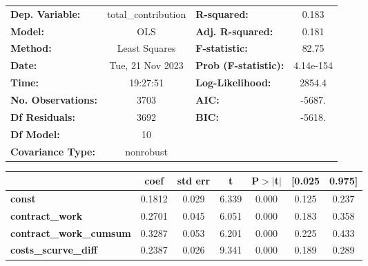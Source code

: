 \begin{center}
\begin{tabular}{lclc}
\toprule
\textbf{Dep. Variable:}                   & total\_contribution & \textbf{  R-squared:         } &     0.183   \\
\textbf{Model:}                           &         OLS         & \textbf{  Adj. R-squared:    } &     0.181   \\
\textbf{Method:}                          &    Least Squares    & \textbf{  F-statistic:       } &     82.75   \\
\textbf{Date:}                            &   Tue, 21 Nov 2023  & \textbf{  Prob (F-statistic):} & 4.14e-154   \\
\textbf{Time:}                            &       19:27:51      & \textbf{  Log-Likelihood:    } &    2854.4   \\
\textbf{No. Observations:}                &          3703       & \textbf{  AIC:               } &    -5687.   \\
\textbf{Df Residuals:}                    &          3692       & \textbf{  BIC:               } &    -5618.   \\
\textbf{Df Model:}                        &            10       & \textbf{                     } &             \\
\textbf{Covariance Type:}                 &      nonrobust      & \textbf{                     } &             \\
\bottomrule
\end{tabular}
\begin{tabular}{lcccccc}
                                          & \textbf{coef} & \textbf{std err} & \textbf{t} & \textbf{P$> |$t$|$} & \textbf{[0.025} & \textbf{0.975]}  \\
\midrule
\textbf{const}                            &       0.1812  &        0.029     &     6.339  &         0.000        &        0.125    &        0.237     \\
\textbf{contract\_work}                   &       0.2701  &        0.045     &     6.051  &         0.000        &        0.183    &        0.358     \\
\textbf{contract\_work\_cumsum}           &       0.3287  &        0.053     &     6.201  &         0.000        &        0.225    &        0.433     \\
\textbf{costs\_scurve\_diff}              &       0.2387  &        0.026     &     9.341  &         0.000        &        0.189    &        0.289     \\

\end{tabular}
\end{center}
